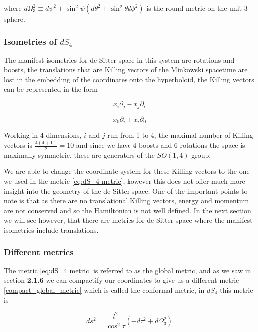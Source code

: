 \documentclass[a4paper,11pt]{article}
\numberwithin{equation}{section}
\numberwithin{figure}{section}
\begin{document}
\begin{large}
where $d\Omega^2_3 \equiv d\psi^2+\sin^2\psi(d\theta^2+\sin^2\theta d\phi^2) $ is the round metric on the unit 3-sphere.


\subsubsection{Isometries of $dS_4$}

The manifest isometries for de Sitter space in this system are rotations and boosts, the translations that are Killing vectors of the Minkowski spacetime are lost in the embedding of the coordinates onto the hyperboloid, the Killing vectors can be represented in the form

\begin{equation}
\label{eq:dS_4 Killingrot}
    x_i\partial_j-x_j\partial_i
\end{equation}

\begin{equation}
\label{eq:dS_4 Killingboost}
    x_0\partial_i+x_i\partial_0
\end{equation}

\newpage

Working in 4 dimensions, $i$ and $j$ run from 1 to 4, the maximal number of  Killing vectors is $\frac{4(4+1)}{2}=10$ and since we have 4 boosts and 6 rotations the space is maximally symmetric, these are generators of the $SO(1,4)$ group.


We are able to change the coordinate system for these Killing vectors to the one we used in the metric \eqref{eq:dS_4 metric}, however this does not offer much more insight into the geometry of the de Sitter space. One of the important points to note is that as there are no translational Killing vectors, energy and momentum are not conserved and so the Hamiltonian is not well defined. In the next section we will see however, that there are metrics for de Sitter space where the manifest isometries include translations.

\subsubsection{Different metrics}

The metric \eqref{eq:dS_4 metric} is referred to as the global metric, and as we saw in section \textbf{2.1.6} we can compactify our coordinates to give us a different metric \eqref{compact_global_metric} which is called the conformal metric, in $dS_4$ this metric is 

\begin{equation}
\label{eq:conformal metric}
    ds^2=\frac{l^2}{\cos^2\tau}(-d\tau^2+d\Omega^2_3)
\end{equation}


\end{large}
\end{document}
